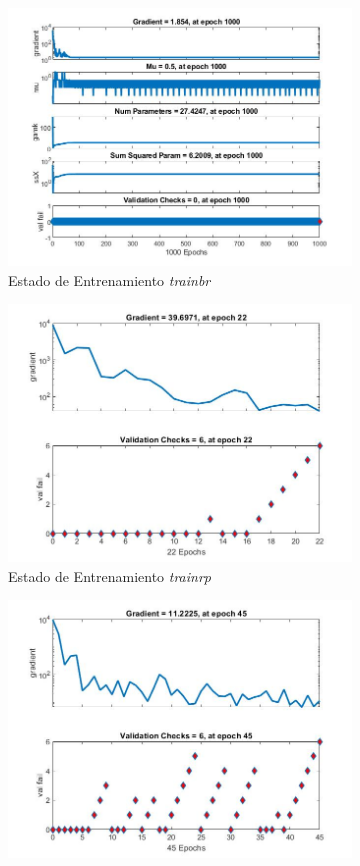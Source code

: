 \documentclass{article}
\begin{document}
\begin{figure}[H]
\centering
 \begin{subfigure}{0.4\textwidth}
  \includegraphics[width=0.8\linewidth]{../images/I_ex3_trainingstate_bodyfat_dataset_trainbr.jpg}
  \caption{Estado de Entrenamiento \textit{trainbr}}
 \end{subfigure}
 \begin{subfigure}{0.4\textwidth}
  \includegraphics[width=0.8\linewidth]{../images/I_ex3_trainingstate_bodyfat_dataset_trainrp.jpg}
  \caption{Estado de Entrenamiento \textit{trainrp}}
 \end{subfigure}
 \begin{subfigure}{0.4\textwidth}
  \includegraphics[width=0.8\linewidth]{../images/I_ex3_trainingstate_bodyfat_dataset_trainoss.jpg}

\end{subfigure}
\end{figure}
\end{document}
